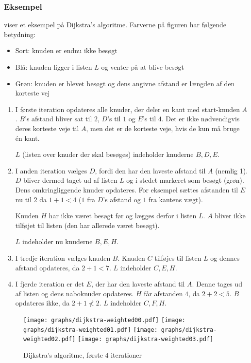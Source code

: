\documentclass[10pt,a4paper,danish]{article}
\begin{document}
\subsubsection{Eksempel}
 viser et eksempel på Dijkstra's
algoritme. Farverne på figuren har følgende betydning:
\begin{itemize}
\item Sort: knuden er endnu ikke besøgt
\item Blå: knuden ligger i listen $L$ og venter på at blive besøgt
\item Grøn: knuden er blevet besøgt og dens angivne afstand er længden af
  den korteste vej
\end{itemize}

\begin{enumerate}
\item I første iteration opdateres alle knuder, der deler en kant med
  start-knuden $A$. $B$'s afstand bliver sat til $2$, $D$'s til $1$ og
  $E$'s til $4$. Det er ikke nødvendigvis deres korteste veje til $A$,
  men det er de korteste veje, hvis de kun må bruge \'en kant.

  $L$ (listen over knuder der skal besøges) indeholder knuderne
  $B,D,E$.

\item I anden iteration vælges $D$, fordi den har den laveste afstand
  til $A$ (nemlig 1). $D$ bliver dermed taget ud af listen $L$ og i
  stedet markeret som besøgt (grøn). Dens omkringliggende knuder
  opdateres. For eksempel sættes afstanden til $E$ nu til $2$ da $1+1
  < 4$ ($1$ fra $D$'s afstand og $1$ fra kantens vægt).

  Knuden $H$ har ikke været besøgt før og lægges derfor i listen
  $L$. $A$ bliver ikke tilføjet til listen (den har allerede været besøgt).

  $L$ indeholder nu knuderne $B,E,H$.

\item I tredje iteration vælges knuden $B$. Knuden $C$ tilføjes til
  listen $L$ og dennes afstand opdateres, da $2+1 < 7$. $L$ indeholder
  $C,E,H$.

\item I fjerde iteration er det $E$, der har den laveste afstand til
  $A$. Denne tages ud af listen og dens naboknuder opdateres. $H$ får
  afstanden $4$, da $2+2<5$. $B$ opdateres ikke, da $2+1\not< 2$. $L$
  indeholder $C,F,H$.
\end{enumerate}


\begin{figure}[h]\centering
\texttt{[image: graphs/dijkstra-weighted00.pdf]}
\texttt{[image: graphs/dijkstra-weighted01.pdf]}
\texttt{[image: graphs/dijkstra-weighted02.pdf]}
\texttt{[image: graphs/dijkstra-weighted03.pdf]}
\caption{Dijkstra's algoritme, første 4 iterationer}
\label{fig:dijkstraw0}
\end{figure}
\end{document}
